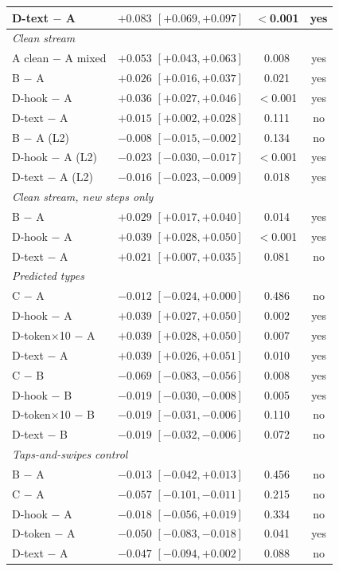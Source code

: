 \begin{table}[t]
{\begin{tabular}{lccc}
\quad D-text $-$ A & $+0.083$ $[+0.069, +0.097]$ & $<$0.001 & yes \\
\midrule
\multicolumn{4}{l}{\emph{Clean stream}} \\
\quad A clean $-$ A mixed & $+0.053$ $[+0.043, +0.063]$ & 0.008 & yes \\
\quad B $-$ A & $+0.026$ $[+0.016, +0.037]$ & 0.021 & yes \\
\quad D-hook $-$ A & $+0.036$ $[+0.027, +0.046]$ & $<$0.001 & yes \\
\quad D-text $-$ A & $+0.015$ $[+0.002, +0.028]$ & 0.111 & no \\
\quad B $-$ A (L2) & $-0.008$ $[-0.015, -0.002]$ & 0.134 & no \\
\quad D-hook $-$ A (L2) & $-0.023$ $[-0.030, -0.017]$ & $<$0.001 & yes \\
\quad D-text $-$ A (L2) & $-0.016$ $[-0.023, -0.009]$ & 0.018 & yes \\
\midrule
\multicolumn{4}{l}{\emph{Clean stream, new steps only}} \\
\quad B $-$ A & $+0.029$ $[+0.017, +0.040]$ & 0.014 & yes \\
\quad D-hook $-$ A & $+0.039$ $[+0.028, +0.050]$ & $<$0.001 & yes \\
\quad D-text $-$ A & $+0.021$ $[+0.007, +0.035]$ & 0.081 & no \\
\midrule
\multicolumn{4}{l}{\emph{Predicted types}} \\
\quad C $-$ A & $-0.012$ $[-0.024, +0.000]$ & 0.486 & no \\
\quad D-hook $-$ A & $+0.039$ $[+0.027, +0.050]$ & 0.002 & yes \\
\quad D-token$\times$10 $-$ A & $+0.039$ $[+0.028, +0.050]$ & 0.007 & yes \\
\quad D-text $-$ A & $+0.039$ $[+0.026, +0.051]$ & 0.010 & yes \\
\quad C $-$ B & $-0.069$ $[-0.083, -0.056]$ & 0.008 & yes \\
\quad D-hook $-$ B & $-0.019$ $[-0.030, -0.008]$ & 0.005 & yes \\
\quad D-token$\times$10 $-$ B & $-0.019$ $[-0.031, -0.006]$ & 0.110 & no \\
\quad D-text $-$ B & $-0.019$ $[-0.032, -0.006]$ & 0.072 & no \\
\midrule
\multicolumn{4}{l}{\emph{Taps-and-swipes control}} \\
\quad B $-$ A & $-0.013$ $[-0.042, +0.013]$ & 0.456 & no \\
\quad C $-$ A & $-0.057$ $[-0.101, -0.011]$ & 0.215 & no \\
\quad D-hook $-$ A & $-0.018$ $[-0.056, +0.019]$ & 0.334 & no \\
\quad D-token $-$ A & $-0.050$ $[-0.083, -0.018]$ & 0.041 & yes \\
\quad D-text $-$ A & $-0.047$ $[-0.094, +0.002]$ & 0.088 & no \\
\bottomrule
\end{tabular}}
\end{table}
